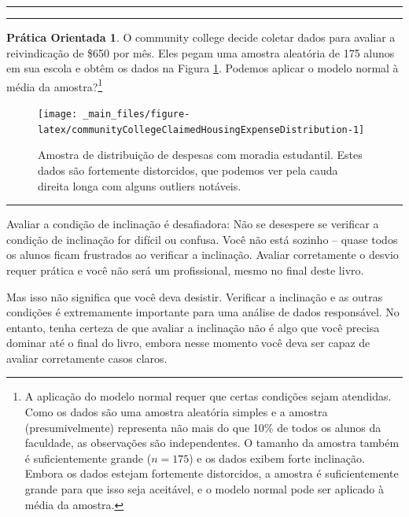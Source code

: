 \documentclass[
]{book}
\theoremstyle{definition}
\theoremstyle{definition}
\theoremstyle{definition}
\newtheorem{exercise}{Prática Orientada}[chapter]
\theoremstyle{definition}
\theoremstyle{remark}
\begin{document}
\begin{center}\rule{0.5\linewidth}{0.5pt}\end{center}

\begin{center}\rule{0.5\linewidth}{0.5pt}\end{center}

\begin{exercise}
\protect\hypertarget{exr:exrdinheiro}{}{\label{exr:exrdinheiro} }O community college decide coletar dados para avaliar a reivindicação de \$650 por mês. Eles pegam uma amostra aleatória de 175 alunos em sua escola e obtêm os dados na Figura \ref{fig:communityCollegeClaimedHousingExpenseDistribution}. Podemos aplicar o modelo normal à média da amostra?\footnote{A aplicação do modelo normal requer que certas condições sejam atendidas. Como os dados são uma amostra aleatória simples e a amostra (presumivelmente) representa não mais do que 10\% de todos os alunos da faculdade, as observações são independentes. O tamanho da amostra também é suficientemente grande (\(n = 175\)) e os dados exibem forte inclinação. Embora os dados estejam fortemente distorcidos, a amostra é suficientemente grande para que isso seja aceitável, e o modelo normal pode ser aplicado à média da amostra.}
\end{exercise}

\begin{figure}

{\centering \texttt{[image: \_main\_files/figure-latex/communityCollegeClaimedHousingExpenseDistribution-1]} 

}

\caption{Amostra de distribuição de despesas com moradia estudantil. Estes dados são fortemente distorcidos, que podemos ver pela cauda direita longa com alguns outliers notáveis.}\label{fig:communityCollegeClaimedHousingExpenseDistribution}
\end{figure}

\begin{center}\rule{0.5\linewidth}{0.5pt}\end{center}

Avaliar a condição de inclinação é desafiadora: Não se desespere se verificar a condição de inclinação for difícil ou confusa. Você não está sozinho -- quase todos os alunos ficam frustrados ao verificar a inclinação. Avaliar corretamente o desvio requer prática e você não será um profissional, mesmo no final deste livro.

Mas isso não significa que você deva desistir. Verificar a inclinação e as outras condições é extremamente importante para uma análise de dados responsável. No entanto, tenha certeza de que avaliar a inclinação não é algo que você precisa dominar até o final do livro, embora nesse momento você deva ser capaz de avaliar corretamente casos claros.
\end{document}

